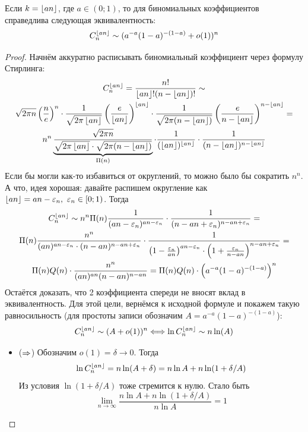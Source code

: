 \begin{theorem}
	Если $k = \left\lfloor an \right\rfloor$, где $a \in (0; 1)$, то для биномиальных коэффициентов справедлива следующая эквивалентность:
	\[
		C_n^{\left\lfloor an \right\rfloor} \sim (a^{-a}(1 - a)^{-(1 - a)} + o(1))^n
	\]
\end{theorem}

\begin{proof}
	Начнём аккуратно расписывать биномиальный коэффициент через формулу Стирлинга:
	\begin{multline*}
		C_n^{\left\lfloor an \right\rfloor} = \frac{n!}{\left\lfloor an \right\rfloor! (n - \left\lfloor an \right\rfloor)!} \sim
		\\
		\sqrt{2\pi n} \left(\frac{n}{e}\right)^n \cdot \frac{1}{\sqrt{2\pi \left\lfloor an \right\rfloor}} \left(\frac{e}{\left\lfloor an \right\rfloor}\right)^{\left\lfloor an \right\rfloor} \cdot \frac{1}{\sqrt{2\pi (n - \left\lfloor an \right\rfloor)}} \left(\frac{e}{n - \left\lfloor an \right\rfloor}\right)^{n - \left\lfloor an \right\rfloor} =
		\\
		n^n \underbrace{\frac{\sqrt{2\pi n}}{\sqrt{2\pi \left\lfloor an \right\rfloor} \cdot \sqrt{2\pi (n - \left\lfloor an \right\rfloor)}}}_{\Pi(n)} \cdot \frac{1}{(\left\lfloor an \right\rfloor)^{\left\lfloor an \right\rfloor}} \cdot \frac{1}{(n - \left\lfloor an \right\rfloor)^{n - \left\lfloor an \right\rfloor}}
	\end{multline*}
	Если бы могли как-то избавиться от округлений, то можно было бы сократить $n^n$. А что, идея хорошая: давайте распишем округление как $\left\lfloor an \right\rfloor = an - \varepsilon_n,\ \varepsilon_n \in [0; 1)$. Тогда
	\begin{multline*}
		C_n^{\left\lfloor an \right\rfloor} \sim n^n \Pi(n) \frac{1}{(an - \varepsilon_n)^{an - \varepsilon_n}} \cdot \frac{1}{(n - an + \varepsilon_n)^{n - an + \varepsilon_n}} =
		\\
		\Pi(n) \frac{n^n}{(an)^{an - \varepsilon_n} \cdot (n - an)^{n - an + \varepsilon_n}} \cdot \frac{1}{\left(1 - \frac{\varepsilon_n}{an}\right)^{an - \varepsilon_n} \cdot \left(1 + \frac{\varepsilon_n}{n - an}\right)^{n - an + \varepsilon_n}} =
		\\
		\Pi(n) Q(n) \cdot \frac{n^n}{(an)^{an} (n - an)^{n - an}} = \Pi(n) Q(n) \cdot \left(a^{-a} (1 - a)^{-(1 - a)}\right)^n
	\end{multline*}
	Остаётся доказать, что 2 коэффициента спереди не вносят вклад в эквивалентность. Для этой цели, вернёмся к исходной формуле и покажем такую равносильность (для простоты записи обозначим $A = a^{-a}(1 - a)^{-(1 - a)}$):
	\[
		C_n^{\left\lfloor an \right\rfloor} \sim (A + o(1))^n \Longleftrightarrow \ln C_n^{\left\lfloor an \right\rfloor} \sim n\ln(A)
	\]
	\begin{itemize}
		\item ($\Rightarrow$) Обозначим $o(1) = \delta \to 0$. Тогда
		\[
			\ln C_n^{\left\lfloor an \right\rfloor} = n\ln(A + \delta) = n\ln A + n\ln(1 + \delta/A)
		\]
		Из условия $\ln(1 + \delta/A)$ тоже стремится к нулю. Стало быть
		\[
			\lim_{n \to \infty} \frac{n\ln A + n\ln(1 + \delta / A)}{n \ln A} = 1
		\]
		

\end{itemize}
\end{proof}
